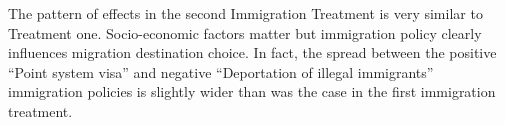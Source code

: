 \documentclass[12pt]{article}
\begin{document}
\begin{comment}
\begin{figure}[t!]
\caption{Conjoint Immigration Treatment: Muslim Ban}\label{fig:treatment_one}
\centerline{\texttt{[image: conjoint1.png]}}
\end{figure}
\end{comment}


\begin{comment}
\begin{figure}%
\caption{Conjoint Immigration Treatment: Deport Illegals}\label{fig:treatment_two}
\centerline{\texttt{[image: conjoint2.png]}}
\end{figure}
\end{comment}

\par The pattern of effects in the second Immigration Treatment is very similar to Treatment one. Socio-economic factors matter but immigration policy clearly influences migration destination choice. In fact, the spread between the positive ``Point system visa'' and negative ``Deportation of illegal immigrants'' immigration policies is slightly wider than was the case in the first immigration treatment.  

\begin{comment}
\begin{figure}[!t]
\caption{Conjoint Immigration Treatment: Country Names}\label{fig:treatment_three}
\centerline{\texttt{[image: conjoint3.png]}}
\end{figure}
\end{comment}

\end{document}
